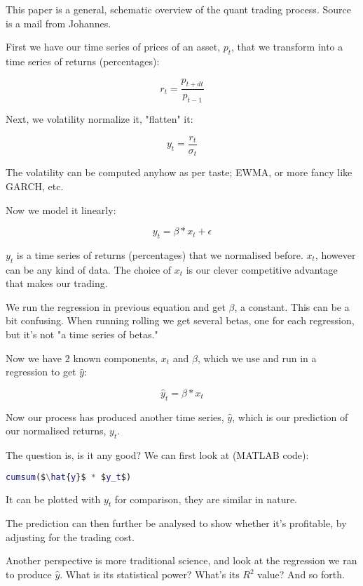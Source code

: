 \documentclass[a4paper]{article}
\title{\documenttitle}
\date{\today}
\author{Frans Englich \href{mailto:fenglich@fastmail.fm}{fenglich@fastmail.fm}}
\begin{document}
\maketitle

This paper is a general, schematic overview of the quant trading process. Source is a mail from Johannes.

First we have our time series of prices of an asset, $p_t$, that we transform into a time series of returns (percentages):

\begin{equation*}
    r_t = \frac{p_{t + dt}}{p_{t - 1}}
\end{equation*}

Next, we volatility normalize it, "flatten" it:

\begin{equation*}
    y_t = \frac{r_t}{\sigma_t}
\end{equation*}

The volatility can be computed anyhow as per taste; EWMA, or more fancy like GARCH, etc.

Now we model it linearly:

\begin{equation*}
    y_t = \beta*x_t + \epsilon
\end{equation*}

$y_t$ is a time series of returns (percentages) that we normalised before. $x_t$, however can be any kind of data. The choice of $x_t$ is our clever competitive advantage that makes our trading.

We run the regression in previous equation and get $\beta$, a constant. This can be a bit confusing. When running rolling we get several betas, one for each regression, but it's not "a time series of betas."

Now we have 2 known components, $x_t$ and $\beta$, which we use and run in a regression to get $\hat{y}$:

\begin{equation*}
    \hat{y}_t = \beta*x_t   
\end{equation*}

Now our process has produced another time series, $\hat{y}$, which is our prediction of our normalised returns, $y_t$.

The question is, is it any good? We can first look at (MATLAB code):

\begin{lstlisting}[language=Matlab, mathescape=true]
cumsum($\hat{y}$ * $y_t$)
\end{lstlisting}

It can be plotted with $y_t$ for comparison, they are similar in nature.

The prediction can then further be analysed to show whether it's profitable, by adjusting for the trading cost.

Another perspective is more traditional science, and look at the regression we ran to produce $\hat{y}$. What is its statistical power? What's its $R^2$ value? And so forth.
\end{document}
